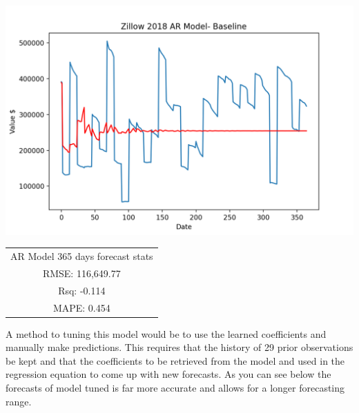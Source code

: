 \documentclass{article}
\begin{document}
	\includegraphics[scale = 0.5]{../plots/2018/zillow2018_AR-model-base365.png}
	\begin{center}
    \begin{tabular}{ c }
     AR Model 365 days forecast stats \\ 
     RMSE: 116,649.77 \\  
     Rsq: -0.114 \\
     MAPE: 0.454 \\
    \end{tabular}
    \end{center} 
	
	A method to tuning this model would be to use the learned coefficients and manually make predictions. This requires that the history of 29 prior observations be kept and that the coefficients to be retrieved from the model and used in the regression equation to come up with new forecasts. As you can see below the forecasts of model tuned is far more accurate and allows for a longer forecasting range. \\
\end{document}
